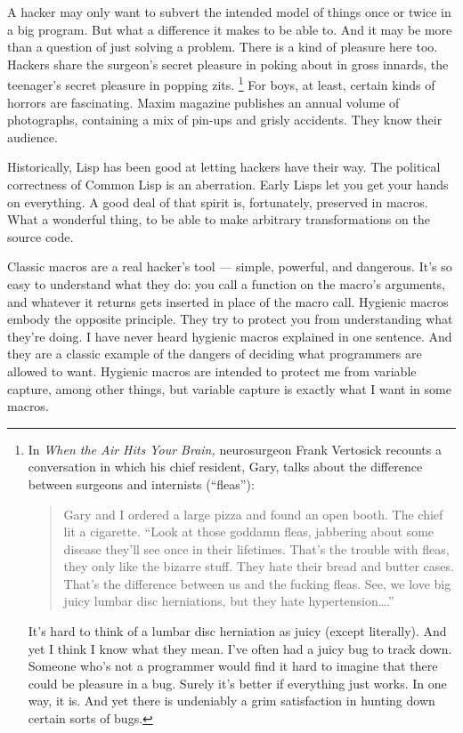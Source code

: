 \documentclass[12pt]{book}
\begin{document}
A hacker may only want to subvert the intended model of things once or
twice in a big program. But what a difference it makes to be able to.
And it may be more than a question of just solving a problem. There is a
kind of pleasure here too. Hackers share the surgeon's secret pleasure
in poking about in gross innards, the teenager's secret pleasure in
popping zits. \footnote{In \emph{When the Air Hits Your Brain,} neurosurgeon Frank
Vertosick recounts a conversation in which his chief resident, Gary,
talks about the difference between surgeons and internists (``fleas''):

\begin{quote}
Gary and I ordered a large pizza and found an open booth. The chief lit
a cigarette. ``Look at those goddamn fleas, jabbering about some disease
they'll see once in their lifetimes. That's the trouble with fleas, they
only like the bizarre stuff. They hate their bread and butter cases.
That's the difference between us and the fucking fleas. See, we love big
juicy lumbar disc herniations, but they hate hypertension\ldots.''
\end{quote}

It's hard to think of a lumbar disc herniation as juicy (except
literally). And yet I think I know what they mean. I've often had a
juicy bug to track down. Someone who's not a programmer would find it
hard to imagine that there could be pleasure in a bug. Surely it's
better if everything just works. In one way, it is. And yet there is
undeniably a grim satisfaction in hunting down certain sorts of bugs.} For boys, at least, certain kinds of horrors are
fascinating. Maxim magazine publishes an annual volume of photographs,
containing a mix of pin-ups and grisly accidents. They know their
audience.

Historically, Lisp has been good at letting hackers have their way. The
political correctness of Common Lisp is an aberration. Early Lisps let
you get your hands on everything. A good deal of that spirit is,
fortunately, preserved in macros. What a wonderful thing, to be able to
make arbitrary transformations on the source code.

Classic macros are a real hacker's tool --- simple, powerful, and
dangerous. It's so easy to understand what they do: you call a function
on the macro's arguments, and whatever it returns gets inserted in place
of the macro call. Hygienic macros embody the opposite principle. They
try to protect you from understanding what they're doing. I have never
heard hygienic macros explained in one sentence. And they are a classic
example of the dangers of deciding what programmers are allowed to want.
Hygienic macros are intended to protect me from variable capture, among
other things, but variable capture is exactly what I want in some
macros.
\end{document}
